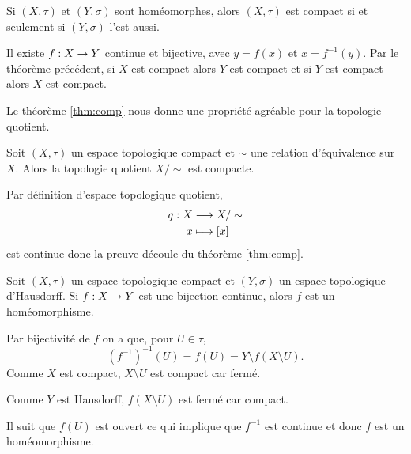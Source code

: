 \documentclass[french]{article}
\begin{document}
\begin{cor}
  Si $(X, \tau)$ et $(Y, \sigma)$ sont homéomorphes, alors $(X, \tau)$ est compact si et seulement si $(Y, \sigma)$ l'est aussi.

  \tcblower
  \begin{preuve}
    Il existe $f: X \rightarrow Y$ continue et bijective, avec $y = f(x)$ et  $x = f^{-1}(y)$. Par le théorème précédent, si $X$ est compact alors $Y$ est compact et si $Y$ est compact alors $X$ est compact.
  \end{preuve}
\end{cor}

Le théorème \ref{thm:comp} nous donne une propriété agréable pour la topologie quotient.

\begin{cor}
  Soit $(X, \tau)$ un espace topologique compact et $\sim$ une relation d'équivalence sur $X$. Alors la topologie quotient  $X /\sim$ est compacte.

  \tcblower
  \begin{preuve}
    Par définition d'espace topologique quotient,
    \begin{align*}
      q: X &\longrightarrow X / \sim \\
      x &\longmapsto [x]
    \end{align*}
    est continue donc la preuve découle du théorème \ref{thm:comp}.
  \end{preuve}
\end{cor}


\begin{theoreme}\label{thm:hom}
  Soit $(X, \tau)$ un espace topologique compact et $(Y, \sigma)$ un espace topologique d'Hausdorff. Si $f: X \rightarrow Y$ est une bijection continue, alors $f$ est un homéomorphisme.

  \tcblower
  \begin{preuve}
    Par bijectivité de $f$ on a que, pour  $U \in \tau$,
    $$\left(f^{-1} \right)^{-1}(U) = f(U) = Y \setminus f(X \setminus U).$$
    Comme $X$ est compact, $X \setminus U$ est compact car fermé.
    \par Comme $Y$ est Hausdorff, $f(X \setminus U)$ est fermé car compact.
    \par Il suit que  $f(U)$ est ouvert ce qui implique que $f^{-1}$ est continue et donc $f$ est un homéomorphisme.
  \end{preuve}
\end{theoreme}
\end{document}
